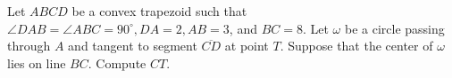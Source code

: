 Let $A B C D$ be a convex trapezoid such that $\angle D A B=\angle A B C=90^{\circ}, D A=2, A B=3$, and $B C=8$. Let $\omega$ be a circle passing through $A$ and tangent to segment $\overline{C D}$ at point $T$. Suppose that the center of $\omega$ lies on line $B C$. Compute $C T$.
